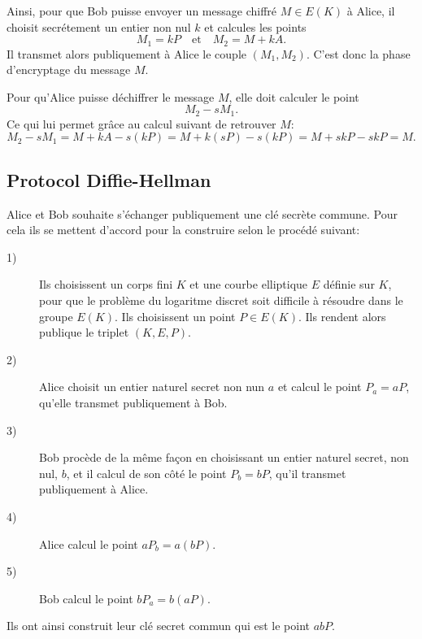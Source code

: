 Ainsi, pour que Bob puisse envoyer un message chiffré $M \in E(K)$ à Alice, il choisit secrétement un entier non nul $k$ et calcules les points
\[
M_1=kP \quad \text{et} \quad M_2=M+kA
.\] 
Il transmet alors publiquement à Alice le couple $(M_1,M_2)$. C'est donc la phase d'encryptage du message $M$.

Pour qu'Alice puisse déchiffrer le message $M$, elle doit calculer le point
\[
M_2-sM_1
.\] 
Ce qui lui permet grâce au calcul suivant de retrouver $M$:
\[
M_2-sM_1=M+kA-s(kP)=M+k(sP)-s(kP)=M+skP-skP=M
.\] 

\subsection{Protocol Diffie-Hellman}

Alice et Bob souhaite s'échanger publiquement une clé secrète commune. Pour cela ils se mettent d'accord pour la construire selon le procédé suivant:

\begin{description}
    \item[1)] Ils choisissent un corps fini $K$ et une courbe elliptique $E$ définie sur $K$, pour que le problème du logaritme discret soit difficile à résoudre dans le groupe $E(K)$. Ils choisissent un point $P \in E(K)$. Ils rendent alors publique le triplet $(K,E,P)$.

    \item[2)] Alice choisit un entier naturel secret non nun $a$ et calcul le point $P_a=aP$, qu'elle transmet publiquement à Bob.

    \item[3)] Bob procède de la même façon en choisissant un entier naturel secret, non nul, $b$, et il calcul de son côté le point $P_b=bP$, qu'il transmet publiquement à Alice.

    \item[4)] Alice calcul le point $aP_b=a(bP)$.

    \item[5)] Bob calcul le point $bP_a=b(aP)$.
\end{description}

Ils ont ainsi construit leur clé secret commun qui est le point $abP$.
